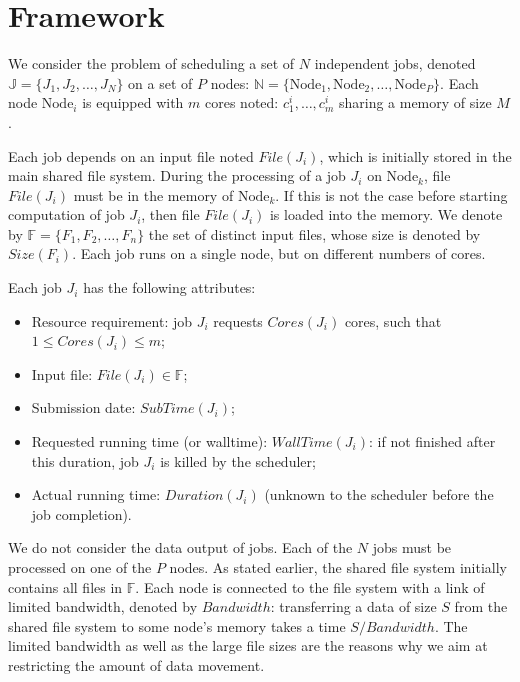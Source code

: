 \documentclass[sigconf,review,anonymous]{acmart}
\newcommand{\Node}[1]{\ensuremath{\mathrm{Node}_{#1}}\xspace}
\newcommand{\file}{\ensuremath{\mathit{File}}\xspace}
\newcommand{\size}{\ensuremath{\mathit{Size}}\xspace}
\newcommand{\memory}{\ensuremath{\mathit{M}}\xspace}
\newcommand{\duration}{\mathit{Duration}\xspace}
\newcommand{\bandwidth}{\mathit{Bandwidth}\xspace}
\newcommand{\core}{\mathit{Cores}\xspace}
\newcommand{\submissiontime}{\mathit{SubTime}\xspace}
\newcommand{\walltime}{\mathit{WallTime}\xspace}
\newcommand{\fileset}{\ensuremath{\mathbb{F}}\xspace}
\newcommand{\jobset}{\ensuremath{\mathbb{J}}\xspace}
\newcommand{\nodeset}{\ensuremath{\mathbb{N}}\xspace}
\begin{document}
\section{Framework}\label{sec.framework}

We consider the problem of scheduling a set of $N$ independent jobs,
denoted $\jobset = \{J_1, J_2, \ldots, J_N\}$ on a set of $P$ nodes:
$\nodeset = \{\Node{1}, \Node{2}, \ldots, \Node{P}\}$.
Each node $\Node{i}$ is equipped with $m$ cores noted:
$c^i_1,\ldots,c^i_m$ sharing a memory of size $\memory$.

Each job depends on an input file noted $\file(J_i)$, which is
initially stored in the main shared file system.  During the
processing of a job $J_i$ on $\Node{k}$, file $\file(J_i)$ must be in
the memory of $\Node{k}$. If this is not the case before starting
computation of job $J_i$, then file $\file(J_i)$ is loaded into the
memory.  We denote by $\fileset = \{F_1, F_2, \ldots, F_n\}$ the set
of distinct input files, whose size is denoted by $\size(F_i)$. Each
job runs on a single node, but on different numbers of cores.



Each job $J_i$ has the following attributes:
\begin{itemize}
\item Resource requirement: job $J_i$ requests $\core(J_i)$  cores, such that $1 \leq \core(J_i) \leq m$;
\item Input file: $\file(J_i) \in \fileset$;
\item Submission date: $\submissiontime(J_i)$;
\item Requested running time (or walltime): $\walltime(J_i)$: if not
  finished after this duration, job $J_i$ is killed by the scheduler;
\item Actual running time: $\duration(J_i)$ (unknown to  the scheduler
  before the job completion).
\end{itemize}

We do not consider the data output of jobs.
Each of the $N$ jobs must be processed on one of the $P$ nodes.  As
stated earlier, the shared file system initially contains all files
in $\fileset$.  Each node is connected to the file system with a link
of limited bandwidth, denoted by $\bandwidth$: transferring a data of
size $S$ from the shared file system to some node's memory takes a
time $S/\bandwidth$.
The limited bandwidth
as well as the large file sizes are the reasons why we aim at
restricting the amount of data movement.
\end{document}
